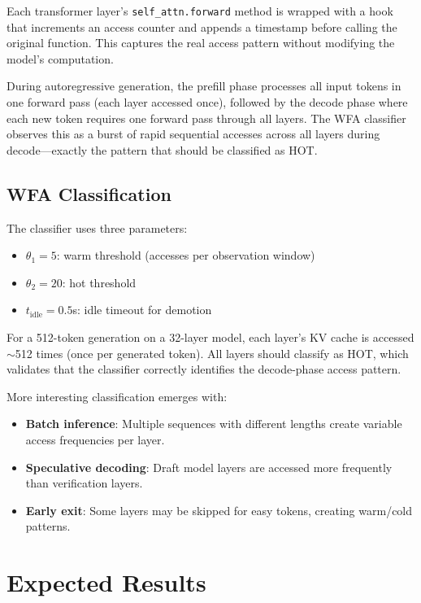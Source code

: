 \documentclass[11pt,letterpaper]{article}
\begin{document}
Each transformer layer's \texttt{self\_attn.forward} method is wrapped with a hook that increments an access counter and appends a timestamp before calling the original function. This captures the real access pattern without modifying the model's computation.

During autoregressive generation, the prefill phase processes all input tokens in one forward pass (each layer accessed once), followed by the decode phase where each new token requires one forward pass through all layers. The WFA classifier observes this as a burst of rapid sequential accesses across all layers during decode---exactly the pattern that should be classified as HOT.

\subsection{WFA Classification}

The classifier uses three parameters:
\begin{itemize}
    \item $\theta_1 = 5$: warm threshold (accesses per observation window)
    \item $\theta_2 = 20$: hot threshold
    \item $t_{\text{idle}} = 0.5$s: idle timeout for demotion
\end{itemize}

For a 512-token generation on a 32-layer model, each layer's KV cache is accessed $\sim$512 times (once per generated token). All layers should classify as HOT, which validates that the classifier correctly identifies the decode-phase access pattern.

More interesting classification emerges with:
\begin{itemize}
    \item \textbf{Batch inference}: Multiple sequences with different lengths create variable access frequencies per layer.
    \item \textbf{Speculative decoding}: Draft model layers are accessed more frequently than verification layers.
    \item \textbf{Early exit}: Some layers may be skipped for easy tokens, creating warm/cold patterns.
\end{itemize}

\section{Expected Results}
\label{sec:results}
\end{document}
